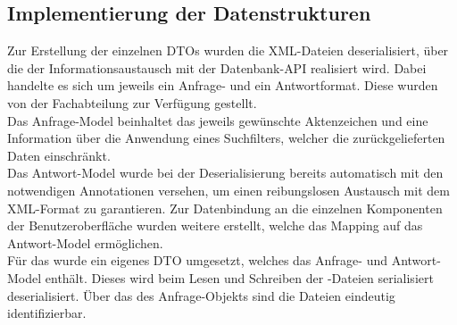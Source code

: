\subsection{Implementierung der Datenstrukturen}
\label{sec:ImplementierungDatenstrukturen}
Zur Erstellung der einzelnen \acs{DTO}s wurden die XML-Dateien deserialisiert, über die der Informationsaustausch mit der Datenbank-\acs{API}
realisiert wird. Dabei handelte es sich um jeweils ein Anfrage- und ein Antwortformat. Diese wurden von der Fachabteilung zur Verfügung
gestellt.\\
Das Anfrage-Model beinhaltet das jeweils gewünschte Aktenzeichen und eine Information über die Anwendung eines Suchfilters,
welcher die zurückgelieferten Daten einschränkt.\\
Das Antwort-Model wurde bei der Deserialisierung bereits automatisch mit den notwendigen Annotationen versehen,
um einen reibungslosen Austausch mit dem XML-Format zu garantieren. Zur Datenbindung an die einzelnen Komponenten der
Benutzeroberfläche wurden weitere  erstellt, welche das Mapping auf das Antwort-Model ermöglichen.\\
Für das  wurde ein eigenes \acs{DTO} umgesetzt, welches das Anfrage- und Antwort-Model enthält.
Dieses wird beim Lesen und Schreiben der -Dateien serialisiert \bzw deserialisiert.
Über das  des Anfrage-Objekts sind die Dateien eindeutig identifizierbar.

